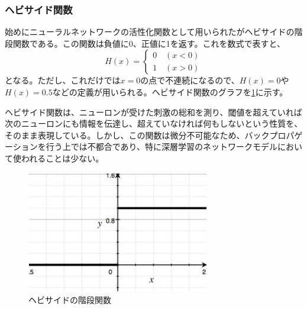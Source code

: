 \subsubsection{ヘビサイド関数}
始めにニューラルネットワークの活性化関数として用いられたがヘビサイドの階段関数である。この関数は負値に0、正値に1を返す。これを数式で表すと、
\begin{equation}
H(x)= \left\{\begin{array}{cc} 0\quad (x < 0)\\ 1 \quad (x > 0)\end{array}\right.
\end{equation}
となる。ただし、これだけでは$x=0$の点で不連続になるので、$H(x)=0$や$H(x)=0.5$などの定義が用いられる。ヘビサイド関数のグラフを\ref{c3_heaviside}に示す。\par
ヘビサイド関数は、ニューロンが受けた刺激の総和を測り、閾値を超えていれば次のニューロンにも情報を伝達し、超えていなければ何もしないという性質を、そのまま表現している。しかし、この関数は微分不可能なため、バックプロパゲーションを行う上では不都合であり、特に深層学習のネットワークモデルにおいて使われることは少ない。
\begin{figure}[tbp]
 \centering
  \includegraphics[width=80mm]{img/c3/heaviside}
 \caption{ヘビサイドの階段関数}
 \label{c3_heaviside}
\end{figure}


